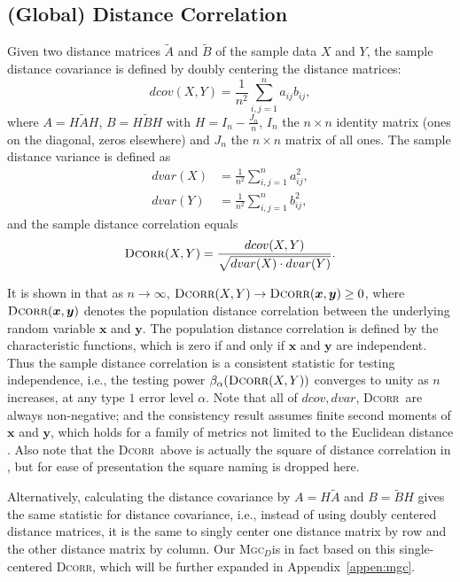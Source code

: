 \documentclass[11pt]{article}
\providecommand{\sct}[1]{{\normalfont\textsc{#1}}}
\providecommand{\mb}[1]{\boldsymbol{#1}}
\newcommand{\Mgcd}{\sct{Mgc$_D$}}
\newcommand{\Dcorr}{\sct{Dcorr}}
\begin{document}
\subsection{(Global) Distance Correlation}
\label{appen:dcorr}
Given two distance matrices $\tilde{A}$ and $\tilde{B}$ of the sample data $X$ and $Y$, the sample distance covariance is defined by doubly centering the distance matrices:
\begin{equation*}
\label{dcovEqu}
dcov(X,Y)=\frac{1}{n^2}\sum_{i,j=1}^{n}a_{ij}b_{ij},
\end{equation*}
where $A=H\tilde{A}H$, $B=H\tilde{B}H$ with $H=I_{n}-\frac{J_{n}}{n}$, $I_n$ the $n \times n$ identity matrix (ones on the diagonal, zeros elsewhere)  and $J_n$ the $n \times n$ matrix of all ones. The sample distance variance is defined as
\begin{align*}
dvar(X) &=\frac{1}{n^2}\sum_{i,j=1}^{n}a_{ij}^{2},\\
dvar(Y) &=\frac{1}{n^2}\sum_{i,j=1}^{n}b_{ij}^{2},
\end{align*}
and the sample distance correlation equals
\begin{equation*}
\Dcorr(X,Y)=\frac{dcov(X,Y)}{\sqrt{dvar(X) \cdot dvar(Y)}}.
\end{equation*}

It is shown in \cite{SzekelyRizzoBakirov2007} that as $n \rightarrow \infty$, $\Dcorr(X,Y) \rightarrow \Dcorr(\mb{x},\mb{y}) \geq 0$, where $\Dcorr(\mb{x},\mb{y})$ denotes the population distance correlation between the underlying random variable $\mb{x}$ and $\mb{y}$. The population distance correlation is defined by the characteristic functions, which is zero if and only if $\mb{x}$ and $\mb{y}$ are independent. Thus the sample distance correlation is a consistent statistic for testing independence, i.e., the testing power $\beta_{\alpha}(\Dcorr(X,Y))$
converges to unity as $n$ increases, at any type $1$ error level $\alpha$. Note that all of $dcov, dvar$, \Dcorr~are always non-negative; and the consistency result assumes finite second moments of $\mb{x}$ and $\mb{y}$, which holds for a family of metrics not limited to the Euclidean distance \cite{Lyons2013}. Also note that the \Dcorr~above is actually the square of distance correlation in \cite{SzekelyRizzoBakirov2007}, but for ease of presentation the square naming is dropped here.

Alternatively, calculating the distance covariance by $A=H\tilde{A}$ and $B=\tilde{B}H$ gives the same statistic for distance covariance, i.e., instead of using doubly centered distance matrices, it is the same to singly center one distance matrix by row and the other distance matrix by column. Our \Mgcd is in fact based on this single-centered \Dcorr, which will be further expanded in Appendix~\ref{appen:mgc}.
\end{document}
